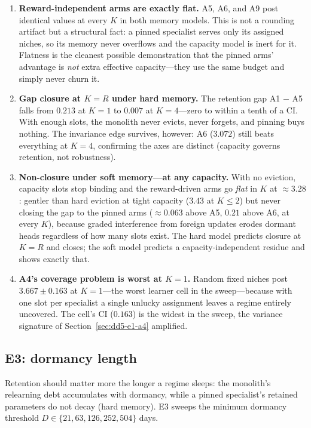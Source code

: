 \begin{enumerate}
\item \textbf{Reward-independent arms are exactly flat.} A5, A6, and A9 post
identical values at every $K$ in both memory models. This is not a rounding
artifact but a structural fact: a pinned specialist serves only its assigned
niches, so its memory never overflows and the capacity model is inert for
it. Flatness is the cleanest possible demonstration that the pinned arms'
advantage is \emph{not} extra effective capacity---they use the same budget
and simply never churn it.
\item \textbf{Gap closure at $K = R$ under hard memory.} The retention gap
A1 $-$ A5 falls from $0.213$ at $K=1$ to $0.007$ at $K=4$---zero to within
a tenth of a CI. With enough slots, the monolith never evicts, never
forgets, and pinning buys nothing. The invariance edge survives, however:
A6 ($3.072$) still beats everything at $K=4$, confirming the axes are
distinct (capacity governs retention, not robustness).
\item \textbf{Non-closure under soft memory---at any capacity.} With no
eviction, capacity slots stop binding and the reward-driven arms go
\emph{flat} in $K$ at $\approx 3.28$: gentler than hard eviction at tight
capacity ($3.43$ at $K \le 2$) but never closing the gap to the pinned
arms ($\approx 0.063$ above A5, $0.21$ above A6, at every $K$), because
graded interference from foreign updates erodes dormant heads regardless
of how many slots exist. The hard model predicts closure at $K = R$ and
closes; the soft model predicts a capacity-independent residue and shows
exactly that.
\item \textbf{A4's coverage problem is worst at $K=1$.} Random fixed niches
post $3.667 \pm 0.163$ at $K=1$---the worst learner cell in the
sweep---because with one slot per specialist a single unlucky assignment
leaves a regime entirely uncovered. The cell's CI ($0.163$) is the widest in
the sweep, the variance signature of Section~\ref{sec:dd5-e1-a4} amplified.
\end{enumerate}

\subsection{E3: dormancy length}
\label{sec:dd5-e3}

Retention should matter more the longer a regime sleeps: the monolith's
relearning debt accumulates with dormancy, while a pinned specialist's
retained parameters do not decay (hard memory). E3 sweeps the minimum
dormancy threshold $D \in \{21, 63, 126, 252, 504\}$ days.

